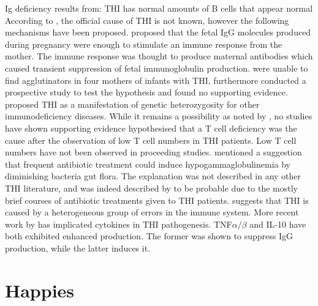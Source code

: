 \documentclass[12pt]{article}
\begin{document}
			{\Huge Ig deficiency results from:}
			{\Huge THI has normal amounts of B cells that appear normal}
			According to \citet{AlHerz14}, the official cause of THI is not known, however the following mechanisms have been proposed. 
			\citet{Fudenberg64} proposed that the fetal IgG molecules produced during pregnancy were enough to stimulate an immune response from the mother. 
			The immune response was thought to produce maternal antibodies which caused transient suppression of fetal immunoglobulin production. 
			\citet{Rosen66} were unable to find agglutinators in four mothers of infants with THI, furthermore \citet{Nathenson71} conducted a prospective study to test the hypothesis and found no supporting evidence.
			\citet{Soothill68} proposed THI as a manifestation of genetic heterozygosity for other immunodeficiency diseases.
			While it remains a possibility as noted by \citet{McGeady87}, no studies have shown supporting evidence \citep{Tiller78, Dressler89, Ovadia14}
			\citet{Siegel81} hypothesised that a T cell deficiency was the cause after the observation of low T cell numbers in THI patients.
			Low T cell numbers have not been observed in proceeding studies.
			\citet{McGeady87} mentioned a suggestion that frequent antibiotic treatment could induce hypogammaglobulinemia by diminishing bacteria gut flora. 
			The explanation was not described in any other THI literature, and was indeed described by \citet{McGeady87} to be probable due to the mostly brief courses of antibiotic treatments given to THI patients.
			\citet{Dalal98} suggests that THI is caused by a heterogeneous group of errors in the immune system.
			More recent work by \citet{Kowalczyk97} has implicated cytokines in THI pathogenesis. 
			TNF$\alpha/\beta$ and IL-10 have both exhibited enhanced production. 
			The former was shown to suppress IgG production, while the latter induces it. 
			
			\section{Happies}
	
\end{document}
